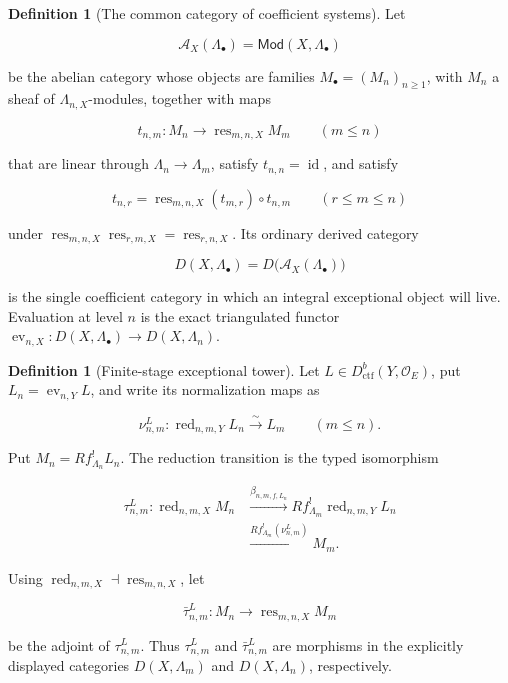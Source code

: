 \documentclass[10pt]{article}
\theoremstyle{definition}
\newtheorem{definition}[theorem]{Definition}
\newcommand{\OO}{\mathcal O}
\newcommand{\Dctf}{D^b_{\mathrm{ctf}}}
\newcommand{\red}{\operatorname{red}}
\begin{document}
\begin{definition}[The common category of coefficient systems]
Let

\[
 \mathcal A_X(\Lambda_\bullet)
 =\mathsf{Mod}(X,\Lambda_\bullet)
\]

be the abelian category whose objects are families \(M_\bullet=(M_n)_{n\geq
1}\), with \(M_n\) a sheaf of \(\Lambda_{n,X}\)-modules, together with maps

\[
 t_{n,m}:M_n\longrightarrow
 \operatorname{res}_{m,n,X}M_m\qquad(m\leq n)
\]

that are linear through \(\Lambda_n\to\Lambda_m\), satisfy
\(t_{n,n}=\operatorname{id}\), and satisfy

\[
 t_{n,r}=\operatorname{res}_{m,n,X}(t_{m,r})\circ t_{n,m}
 \qquad(r\leq m\leq n)
\]

under
\(\operatorname{res}_{m,n,X}\operatorname{res}_{r,m,X}
=\operatorname{res}_{r,n,X}\).  Its ordinary derived category

\[
 D(X,\Lambda_\bullet)=D\bigl(\mathcal A_X(\Lambda_\bullet)\bigr)
\]

is the single coefficient category in which an integral exceptional object
will live.  Evaluation at level \(n\) is the exact triangulated functor
\(\operatorname{ev}_{n,X}:D(X,\Lambda_\bullet)\to D(X,\Lambda_n)\).
\end{definition}

\begin{definition}[Finite-stage exceptional tower]
Let \(L\in\Dctf(Y,\OO_E)\), put
\(L_n=\operatorname{ev}_{n,Y}L\), and write its normalization maps as

\[
 \nu^L_{n,m}:\red_{n,m,Y}L_n\xrightarrow{\sim}L_m
 \qquad(m\leq n).
\]

Put \(M_n=Rf^!_{\Lambda_n}L_n\).  The reduction transition is the typed
isomorphism

\[
\begin{aligned}
 \tau^L_{n,m}:\red_{n,m,X}M_n
 &\xrightarrow{\beta_{n,m,f,L_n}}
 Rf^!_{\Lambda_m}\red_{n,m,Y}L_n\\
 &\xrightarrow{Rf^!_{\Lambda_m}(\nu^L_{n,m})}M_m.
\end{aligned}
\]

Using \(\red_{n,m,X}\dashv\operatorname{res}_{m,n,X}\), let

\[
 \bar\tau^L_{n,m}:M_n\longrightarrow
 \operatorname{res}_{m,n,X}M_m
\]

be the adjoint of \(\tau^L_{n,m}\).  Thus \(\tau^L_{n,m}\) and
\(\bar\tau^L_{n,m}\) are morphisms in the explicitly displayed categories
\(D(X,\Lambda_m)\) and \(D(X,\Lambda_n)\), respectively.
\end{definition}
\end{document}
